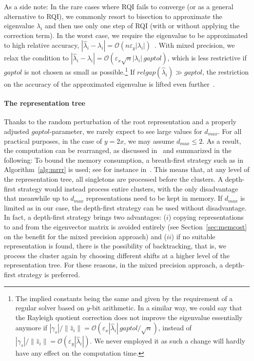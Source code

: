 \documentclass[final]{siamltex}
\newcommand\norm[1]{\lVert#1\rVert}
\newcommand\order[1]{\mathcal{O}(#1)}
\begin{document}
As a side note: In the rare cases where RQI fails to converge (or as a general alternative to
RQI), we commonly resort to bisection to approximate the eigenvalue
$\lambda_i$ and then use only one step of RQI (with or without
applying the correction term). In the worst case, we require the eigenvalue to be
approximated to high relative accuracy, $|\hat{\lambda}_i -
\lambda_i| = \order{n \varepsilon_y
  |\lambda_i|}$~\cite{Dhillon:2004:Ortvecs}. With mixed precision, we 
relax the condition to $|\hat{\lambda}_i - \lambda_i| =
\order{\varepsilon_x \sqrt{n} |\lambda_i| \, gaptol}$, which is less
restrictive if $gaptol$ is not chosen as small as
possible.\footnote{The implied constants being the same and given by the
  requirement of a regular solver based on $y$-bit arithmetic. In a similar way, we
  could say that the Rayleigh quotient correction does not
  improve the eigenvalue essentially anymore 
  if $|\gamma_s|/\norm{\hat{z}_i} = \order{\varepsilon_x |\hat{\lambda}_i|
    \, gaptol / \sqrt{n}}$, instead of $|\gamma_s|/\norm{\hat{z}_i} =
  \order{\varepsilon_y |\hat{\lambda}_i|}$. We never employed it as such a
  change will hardly have any effect on the computation time.} If
$relgap(\hat{\lambda}_i) \gg gaptol$, the restriction on the accuracy of the
approximated eigenvalue is lifted even further~\cite{Willems:Diss}. 

\paragraph{The representation tree} 
Thanks to the random
perturbation of the root representation and a properly adjusted
$gaptol$-parameter, we rarely expect to see large values for $d_{max}$. For all
practical purposes, in the case of $y = 2x$, we may assume $d_{max} \leq
2$. As a result,
the computation can be rearranged, as discussed
in~\cite{Willems:framework} and summarized in the following: To bound the memory
consumption, a breath-first strategy such as in Algorithm~\ref{alg:mrrr} is used; see for
instance in~\cite{DesignMRRR,mr3smp}. This means that, at
any level of the representation tree, all singletons are processed before the
clusters. A depth-first strategy would instead process entire clusters,
with the
only disadvantage that meanwhile up to $d_{max}$ representations need to 
be kept in memory. If $d_{max}$ is limited as in our case, the depth-first
strategy can be used without disadvantage. In fact, a depth-first strategy
brings two advantages: ($i$) 
copying representations to and from the eigenvector matrix is avoided entirely (see
Section~\ref{sec:memcost} on the benefit for the mixed precision approach) and ($ii$) if no
suitable representation is found, there is the possibility of
backtracking, that is, we process the cluster again by choosing different
shifts at a higher level of the representation tree. For these reasons, in the mixed
precision approach, a depth-first strategy is preferred. 
\end{document}
